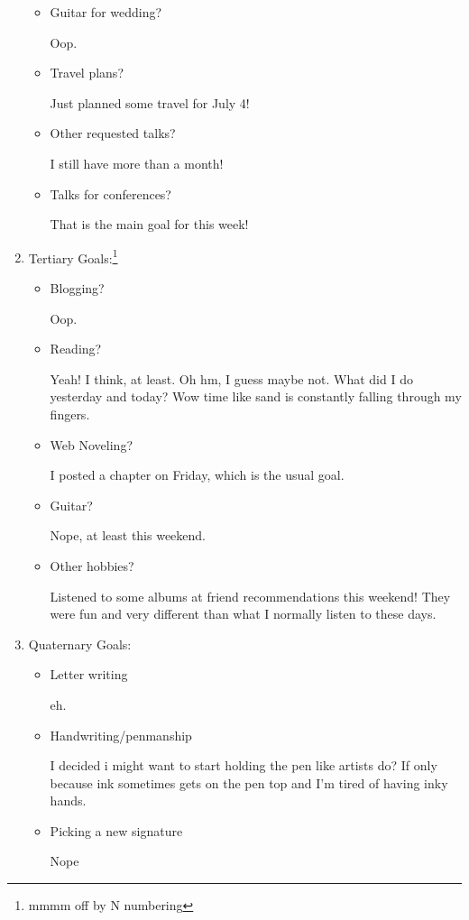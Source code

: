 \documentclass[12pt]{article}
\renewcommand{\,}{\textsuperscript{,}}
\begin{document}
\begin{enumerate}
\begin{itemize}
\item Guitar for wedding?

Oop.

\item Travel plans?

Just planned some travel for July 4!

\item Other requested talks?

I still have more than a month!

\item Talks for conferences?

That is the main goal for this week!

\end{itemize}

\item Tertiary Goals:\footnote{mmmm off by N numbering}

\begin{itemize}

\item Blogging?

Oop.

\item Reading?

Yeah! I think, at least. Oh hm, I guess maybe not. What did I do yesterday and today? Wow time like sand is constantly falling through my fingers.

\item Web Noveling?

I posted a chapter on Friday, which is the usual goal.

\item Guitar?

Nope, at least this weekend.

\item Other hobbies?

Listened to some albums at friend recommendations this weekend! They were fun and very different than what I normally listen to these days.

\end{itemize}

\item Quaternary Goals:

\begin{itemize}

\item Letter writing

eh.

\item Handwriting/penmanship

I decided i might want to start holding the pen like artists do? If only because ink sometimes gets on the pen top and I'm tired of having inky hands.

\item Picking a new signature

Nope

\end{itemize}

\end{enumerate}
\end{document}
